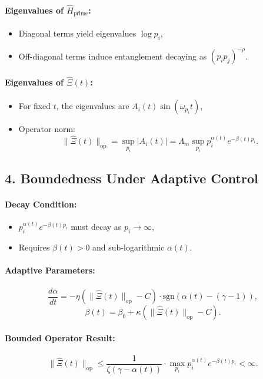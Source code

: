 \documentclass{article}
\theoremstyle{plain}
\theoremstyle{claimstyle}
\begin{document}
\paragraph*{Eigenvalues of \( \hat{H}_{\text{prime}} \):}
\begin{itemize}
    \item Diagonal terms yield eigenvalues \( \log p_i \),
    \item Off-diagonal terms induce entanglement decaying as \( (p_i p_j)^{-\rho} \).
\end{itemize}

\paragraph*{Eigenvalues of \( \hat{\Xi}(t) \):}
\begin{itemize}
    \item For fixed \( t \), the eigenvalues are \( A_i(t) \sin(\omega_{p_i} t) \),
    \item Operator norm:
    \[
    \| \hat{\Xi}(t) \|_{\text{op}} = \sup_{p_i} |A_i(t)| = \Lambda_m \sup_{p_i} p_i^{\alpha(t)} e^{-\beta(t) p_i}.
    \]
\end{itemize}

\subsection*{4. Boundedness Under Adaptive Control}

\paragraph*{Decay Condition:}
\begin{itemize}
    \item \( p_i^{\alpha(t)} e^{-\beta(t) p_i} \) must decay as \( p_i \to \infty \),
    \item Requires \( \beta(t) > 0 \) and sub-logarithmic \( \alpha(t) \).
\end{itemize}

\paragraph*{Adaptive Parameters:}
\[
\frac{d\alpha}{dt} = -\eta \left( \| \hat{\Xi}(t) \|_{\text{op}} - C \right) \cdot \text{sgn}(\alpha(t) - (\gamma - 1)),
\]
\[
\beta(t) = \beta_0 + \kappa \left( \| \hat{\Xi}(t) \|_{\text{op}} - C \right).
\]

\paragraph*{Bounded Operator Result:}
\[
\| \hat{\Xi}(t) \|_{\text{op}} \leq \frac{1}{\zeta(\gamma - \alpha(t))} \cdot \max_{p_i} p_i^{\alpha(t)} e^{-\beta(t) p_i} < \infty.
\]
\end{document}
